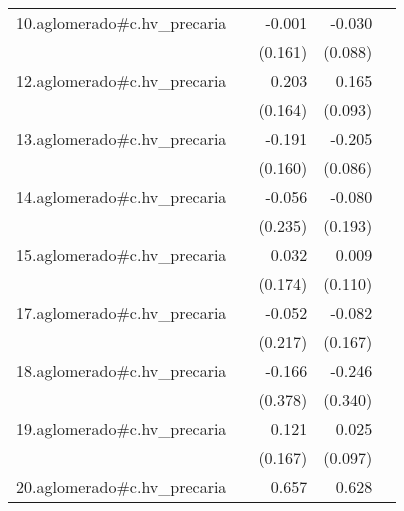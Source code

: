 {\begin{longtable}{l*{4}{D{.}{.}{-1}}}
\addlinespace
10.aglomerado#c.hv\_precaria&                     &      -0.001         &      -0.030         &                     \\
            &                     &     (0.161)         &     (0.088)         &                     \\
\addlinespace
12.aglomerado#c.hv\_precaria&                     &       0.203         &       0.165         &                     \\
            &                     &     (0.164)         &     (0.093)         &                     \\
\addlinespace
13.aglomerado#c.hv\_precaria&                     &      -0.191         &      -0.205\sym{*}  &                     \\
            &                     &     (0.160)         &     (0.086)         &                     \\
\addlinespace
14.aglomerado#c.hv\_precaria&                     &      -0.056         &      -0.080         &                     \\
            &                     &     (0.235)         &     (0.193)         &                     \\
\addlinespace
15.aglomerado#c.hv\_precaria&                     &       0.032         &       0.009         &                     \\
            &                     &     (0.174)         &     (0.110)         &                     \\
\addlinespace
17.aglomerado#c.hv\_precaria&                     &      -0.052         &      -0.082         &                     \\
            &                     &     (0.217)         &     (0.167)         &                     \\
\addlinespace
18.aglomerado#c.hv\_precaria&                     &      -0.166         &      -0.246         &                     \\
            &                     &     (0.378)         &     (0.340)         &                     \\
\addlinespace
19.aglomerado#c.hv\_precaria&                     &       0.121         &       0.025         &                     \\
            &                     &     (0.167)         &     (0.097)         &                     \\
\addlinespace
20.aglomerado#c.hv\_precaria&                     &       0.657         &       0.628         &                     \\

\end{longtable}}
